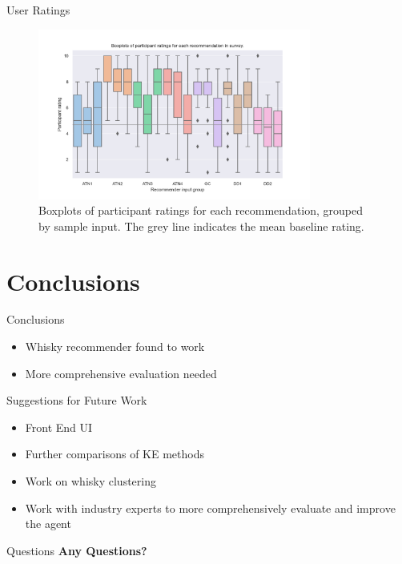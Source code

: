 \documentclass{beamer}
\begin{document}
\begin{frame}{User Ratings}
    \begin{figure}[!htb]
        \centering
        \includegraphics[width=0.8\textwidth]{graphics/all_recommendations}
        \caption{Boxplots of participant ratings for each recommendation, grouped by sample input. The grey line 
        indicates the mean baseline rating.}\label{fig:allrec}
    \end{figure}
\end{frame}


\section{Conclusions} 

\begin{frame}{Conclusions}
    
    \begin{itemize}
        \item Whisky recommender found to work
        \item More comprehensive evaluation needed
    \end{itemize}
    \begin{block}{Suggestions for Future Work}
        \begin{itemize}
            \item Front End UI
            \item Further comparisons of KE methods
            \item Work on whisky clustering
            \item Work with industry experts to more comprehensively evaluate and improve the agent
        \end{itemize}
    \end{block}

\end{frame}

\begin{frame}{Questions}
\textbf{Any Questions?}
\end{frame}

\end{document}
